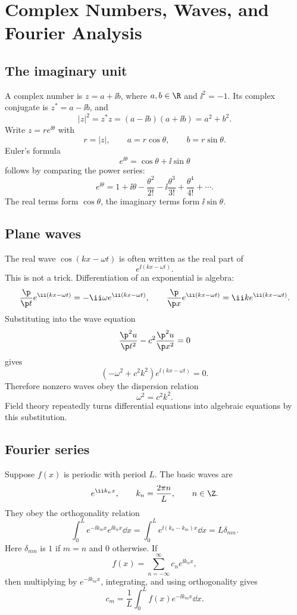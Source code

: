 \chapter{Complex Numbers, Waves, and Fourier Analysis}

\section{The imaginary unit}

A complex number is \(z=a+\ii b\), where \(a,b\in\R\) and \(\ii^2=-1\).  Its complex conjugate is \(z^*=a-\ii b\), and
\[
  |z|^2=z^*z=(a-\ii b)(a+\ii b)=a^2+b^2.
\]
Write \(z=re^{\ii\theta}\) with
\[
  r=|z|,\qquad a=r\cos\theta,\qquad b=r\sin\theta.
\]
Euler's formula
\[
  e^{\ii\theta}=\cos\theta+\ii\sin\theta
\]
follows by comparing the power series:
\[
  e^{\ii\theta}
  =
  1+\ii\theta-\frac{\theta^2}{2!}
  -\ii\frac{\theta^3}{3!}
  +\frac{\theta^4}{4!}+\cdots .
\]
The real terms form \(\cos\theta\), the imaginary terms form \(\ii\sin\theta\).

\section{Plane waves}

The real wave \(\cos(kx-\omega t)\) is often written as the real part of
\[
  e^{\ii(kx-\omega t)}.
\]
This is not a trick.  Differentiation of an exponential is algebra:
\[
  \frac{\p}{\p t}e^{\ii(kx-\omega t)}=-\ii\omega e^{\ii(kx-\omega t)},\qquad
  \frac{\p}{\p x}e^{\ii(kx-\omega t)}=\ii k e^{\ii(kx-\omega t)}.
\]
Substituting into the wave equation
\[
  \frac{\p^2 u}{\p t^2}-c^2\frac{\p^2u}{\p x^2}=0
\]
gives
\[
  (-\omega^2+c^2k^2)e^{\ii(kx-\omega t)}=0.
\]
Therefore nonzero waves obey the dispersion relation
\[
  \omega^2=c^2k^2.
\]
Field theory repeatedly turns differential equations into algebraic equations by this substitution.

\section{Fourier series}

Suppose \(f(x)\) is periodic with period \(L\).  The basic waves are
\[
  e^{\ii k_nx},\qquad k_n=\frac{2\pi n}{L},\qquad n\in\Z.
\]
They obey the orthogonality relation
\[
  \int_0^L e^{-\ii k_mx}e^{\ii k_nx}\dd x
  =
  \int_0^L e^{\ii(k_n-k_m)x}\dd x
  =
  L\delta_{mn}.
\]
Here \(\delta_{mn}\) is \(1\) if \(m=n\) and \(0\) otherwise.  If
\[
  f(x)=\sum_{n=-\infty}^{\infty}c_ne^{\ii k_nx},
\]
then multiplying by \(e^{-\ii k_mx}\), integrating, and using orthogonality gives
\[
  c_m=\frac1L\int_0^L f(x)e^{-\ii k_mx}\dd x.
\]


